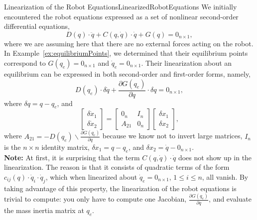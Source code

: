   \begin{propColor}{Linearization of the Robot Equations}{LinearizedRobotEquations}
We initially encountered the robot equations expressed as a set of nonlinear second-order differential equations,
$$ D(q) \cdot \ddot{q} + C(q, \dot{q}) \cdot \dot{q} + G(q) = 0_{n \times 1}, $$
where we are assuming here that there are no external forces acting on the robot. In Example~\ref{ex:equilibriumPoints}, we determined that their equilibrium points correspond to $G(q_e) = 0_{n \times 1}$ and $\dot{q}_e=0_{n \times 1}$. Their linearization about an equilibrium can be expressed in both second-order and first-order forms, namely,
\begin{equation}
    \label{eq:RobotEqnLinearizedSecondOrder}
    D(q_e) \cdot \delta \ddot{q} + \frac{\partial G(q_e)}{\partial q} \cdot \delta q = 0_{n \times 1},
\end{equation}
where $\delta q = q-q_e$, and
\begin{equation}
    \label{eq:RobotEqnLinearizedSecondOrderV02}
  \left[ \begin{array}{c} \delta \dot{x}_1 \\ \delta  \dot{x}_2 \end{array} \right] = \left[ \begin{array}{cc} 0_n & I_n \\ A_{21} & 0_n \end{array} \right] \left[ \begin{array}{c} \delta {x}_1 \\ \delta {x}_2 \end{array} \right], 
\end{equation}
where $A_{21}= -D(q_e) \backslash \frac{\partial G(q_e)}{\partial q}$ because we know not to invert large matrices, $I_n$ is the $n \times n$ identity matrix, $\delta x_1 = q- q_e$, and $\delta x_2 = \dot{q} - 0_{n \times 1}$.\\

\textbf{Note:} At first, it is surprising that the term $C(q, \dot{q}) \cdot \dot{q}$ does not show up in the linearization. The reason is that it consists of quadratic terms of the form $c_{ij}(q) \cdot \dot{q}_i \cdot \dot{q}_j$, which when linearized about $\dot{q}_e=0_{n \times 1}$, $1 \le i \le n$, all vanish. By taking advantage of this property, the linearization of the robot equations is trivial to compute: you only have to compute one Jacobian, $\frac{\partial G(q_e)}{\partial q}$, and evaluate the mass inertia matrix at $q_e$. 

  \end{propColor}

